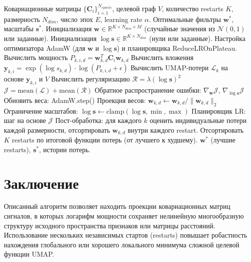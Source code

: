 \documentclass[a4paper,12pt]{article}
\begin{document}
\begin{algorithm}[H]
\caption{Алгоритм \texttt{fit\_filters}}
\begin{algorithmic}[1]
\Require Ковариационные матрицы $\{\mathbf{C}_i\}_{i=1}^{N_{epochs}}$, целевой граф $V$, количество restarts $K$, размерность $N_{dim}$, число эпох $E$, learning rate $\alpha$.
\Ensure Оптимальные фильтры $\mathbf{w}^*$, масштабы $\mathbf{s}^*$.
\State Инициализация $\mathbf{w} \in \mathbb{R}^{K \times N_{dim} \times M}$ (случайные значения из $\mathcal{N}(0, 1)$ или заданные).
\State Инициализация $\log \mathbf{s} \in \mathbb{R}^{K \times N_{dim}}$ (нули или заданные).
\State Настройка оптимизатора AdamW (для $\mathbf{w}$ и $\log \mathbf{s}$) и планировщика ReduceLROnPlateau.
    \State Вычислить мощность $P_{k,i,d} = \mathbf{w}_{k,d}^T \mathbf{C}_i \mathbf{w}_{k,d}$
    \State Вычислить вложения $\mathbf{y}_{k,i} = \exp(\log s_{k,d}) \cdot \log(P_{k,i,d} + \epsilon)$
    \State Вычислить UMAP-потери $\mathcal{L}_k$ на основе $\mathbf{y}_{k,i}$ и $V$
    \State Вычислить регуляризацию $\mathcal{R} = \lambda (\log \mathbf{s})^2$
    \State $\mathcal{J} = \text{mean}(\mathcal{L}) + \text{mean}(\mathcal{R})$
    \State Обратное распространение ошибки: $\nabla_{\mathbf{w}} \mathcal{J}$, $\nabla_{\log \mathbf{s}} \mathcal{J}$
    \State Обновить веса: AdamW.step()
    \State Проекция весов: $\mathbf{w}_{k,d} \leftarrow \mathbf{w}_{k,d} / \|\mathbf{w}_{k,d}\|_2$
    \State Ограничение масштабов: $\log \mathbf{s} \leftarrow \text{clamp}(\log \mathbf{s}, \min, \max)$
    \State Планировщик LR: шаг на основе $\mathcal{J}$
\EndFor
\State Пост-обработка: для каждого $k$ оценить индивидуальные потери каждой размерности, отсортировать $\mathbf{w}_{k,d}$ внутри каждого restart.
\State Отсортировать $K$ restarts по итоговой функции потерь (от лучшего к худшему).
\State \Return $\mathbf{w}^*$ (лучшие restarts), $\mathbf{s}^*$, истории потерь.
\end{algorithmic}
\end{algorithm}

\section{Заключение}
Описанный алгоритм позволяет находить проекции ковариационных матриц сигналов, в которых логарифм мощности сохраняет нелинейную многообразную структуру исходного пространства признаков или матрицы расстояний. Использование нескольких независимых стартов (restarts) повышает робастность нахождения глобального или хорошего локального минимума сложной целевой функции UMAP.
\end{document}
